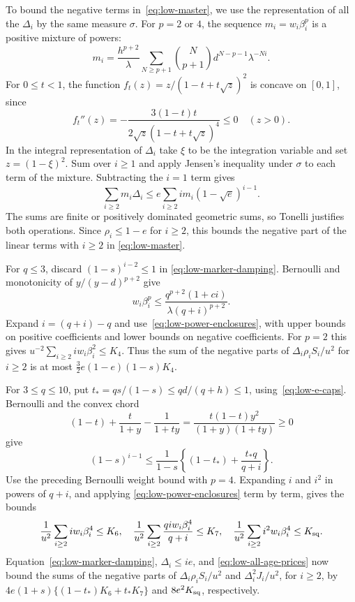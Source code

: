 To bound the negative terms in~\eqref{eq:low-master}, we use
the representation of all the $\Delta_i$ by the same measure $\sigma$. For
$p=2$ or $4$, the sequence
$m_i=w_i\beta_i^p$ is a positive mixture of powers:
\[
 m_i=\frac{h^{p+2}}\lambda
       \sum_{N\ge p+1}\binom{N}{p+1}d^{N-p-1}\lambda^{-Ni}.
\]
For $0\le t<1$, the function
$f_t(z)=z/(1-t+t\sqrt z)^2$ is concave on $[0,1]$, since
\[
 f_t''(z)=-\frac{3(1-t)t}
                       {2\sqrt z(1-t+t\sqrt z)^4}\le0
 \quad(z>0).
\]
In the integral representation of $\Delta_i$ take $\xi$ to be the
integration variable and set $z=(1-\xi)^2$. Sum over $i\ge1$ and
apply Jensen's inequality under $\sigma$ to each term of the mixture.
Subtracting the $i=1$ term gives
\begin{equation}\label{eq:low-marker-damping}
 \sum_{i\ge2}m_i\Delta_i
 \le e\sum_{i\ge2}i m_i(1-\sqrt e)^{i-1}.
\end{equation}
The sums are finite or positively dominated geometric sums, so
Tonelli justifies both operations.  Since $\rho_i\le1-e$ for
$i\ge2$, this bounds the negative part of the linear terms with $i\ge2$ in
\eqref{eq:low-master}.

For $q\le3$, discard $(1-s)^{i-2}\le1$ in
\eqref{eq:low-marker-damping}.  Bernoulli and monotonicity of
$y/(y-d)^{p+2}$ give
\[
 w_i\beta_i^p\le
        \frac{q^{p+2}(1+ci)}{\lambda(q+i)^{p+2}}.
\]
Expand $i=(q+i)-q$ and use~\eqref{eq:low-power-enclosures}, with
upper bounds on positive coefficients and lower bounds on negative
coefficients.  For $p=2$ this gives
$u^{-2}\sum_{i\ge2}i w_i\beta_i^2\le K_4$.
Thus the sum of the negative parts of $\Delta_i\rho_i S_i/u^2$ for $i\ge2$ is at most
$\tfrac32e(1-e)(1-s)K_4$.

For $3\le q\le10$, put $t_*=qs/(1-s)\le qd/(q+h)\le1$,
using~\eqref{eq:low-e-caps}.  Bernoulli and the convex chord
\[
 (1-t)+\frac{t}{1+y}-\frac1{1+ty}
       =\frac{t(1-t)y^2}{(1+y)(1+ty)}\ge0
\]
give
\[
 (1-s)^{i-1}\le\frac1{1-s}
       \left\{(1-t_*)+\frac{t_*q}{q+i}\right\}.
\]
Use the preceding Bernoulli weight bound with $p=4$.
Expanding $i$ and $i^2$ in powers of $q+i$, and applying
\eqref{eq:low-power-enclosures} term by term, gives the
bounds
\[
 \frac1{u^2}\sum_{i\ge2}i w_i\beta_i^4\le K_6,
 \quad\frac1{u^2}\sum_{i\ge2}\frac{qi w_i\beta_i^4}{q+i}\le K_7,
 \quad\frac1{u^2}\sum_{i\ge2}i^2w_i\beta_i^4\le K_{\rm sq}.
\]
Equation~\eqref{eq:low-marker-damping}, $\Delta_i\le i e$, and
\eqref{eq:low-all-age-prices} now bound the sums of the negative parts
of $\Delta_i\rho_i S_i/u^2$ and $\Delta_i^2J_i/u^2$, for $i\ge2$, by
$4e(1+s)\{(1-t_*)K_6+t_*K_7\}$ and $8e^2K_{\rm sq}$,
respectively.

